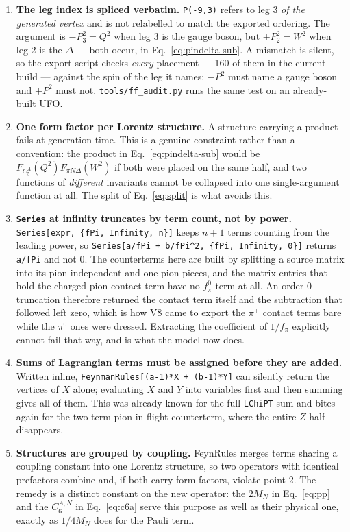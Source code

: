 \documentclass[11pt,a4paper]{article}
\newcommand{\code}[1]{\texttt{\small #1}}
\begin{document}
\begin{enumerate}
\item \textbf{The leg index is spliced verbatim.} \code{P(-9,3)} refers to leg 3
\emph{of the generated vertex} and is not relabelled to match the exported
ordering. The argument is $-P_3^2 = Q^2$ when leg 3 is the gauge boson, but
$+P_2^2 = W^2$ when leg 2 is the $\Delta$ — both occur, in
Eq.~\eqref{eq:pindelta-sub}. A mismatch is silent, so the export script checks
\emph{every} placement --- 160 of them in the current build --- against the spin
of the leg it names: ${-}P^2$ must name a gauge boson and ${+}P^2$ must not.
\code{tools/ff\_audit.py} runs the same test on an already-built UFO.

\item \textbf{One form factor per Lorentz structure.} A structure carrying a
product fails at generation time. This is a genuine constraint rather than a
convention: the product in Eq.~\eqref{eq:pindelta-sub} would be
$F_{C_5^A}(Q^2)F_{\pi N\Delta}(W^2)$ if both were placed on the same half, and
two functions of \emph{different} invariants cannot be collapsed into one
single-argument function at all. The split of Eq.~\eqref{eq:split} is what avoids
this.

\item \textbf{\code{Series} at infinity truncates by term count, not by power.}
\code{Series[expr, \{fPi, Infinity, n\}]} keeps $n+1$ terms counting from the
leading power, so \code{Series[a/fPi + b/fPi\^{}2, \{fPi, Infinity, 0\}]} returns
\code{a/fPi} and not $0$. The counterterms here are built by splitting a source
matrix into its pion-independent and one-pion pieces, and the matrix entries
that hold the charged-pion contact term have no $f_\pi^0$ term at all. An
order-$0$ truncation therefore returned the contact term itself and the
subtraction that followed left zero, which is how V8 came to export the
$\pi^\pm$ contact terms bare while the $\pi^0$ ones were dressed. Extracting the
coefficient of $1/f_\pi$ explicitly cannot fail that way, and is what the model
now does.

\item \textbf{Sums of Lagrangian terms must be assigned before they are added.}
Written inline, \code{FeynmanRules[(a-1)*X + (b-1)*Y]} can silently return the
vertices of $X$ alone; evaluating $X$ and $Y$ into variables first and then
summing gives all of them. This was already known for the full \code{LChiPT}
sum and bites again for the two-term pion-in-flight counterterm, where the
entire $Z$ half disappears.

\item \textbf{Structures are grouped by coupling.} FeynRules merges terms sharing
a coupling constant into one Lorentz structure, so two operators with identical
prefactors combine and, if both carry form factors, violate point 2. The remedy
is a distinct constant on the new operator: the $2M_N$ in Eq.~\eqref{eq:pp} and
the $C_6^{A,N}$ in Eq.~\eqref{eq:c6a} serve this purpose as well as their
physical one, exactly as $1/4M_N$ does for the Pauli term.
\end{enumerate}
\end{document}

